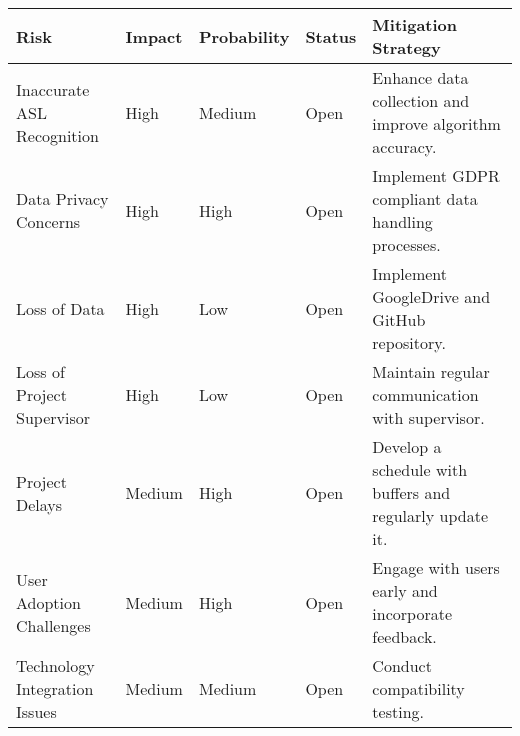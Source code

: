 \begin{longtable}{|>{\raggedright\arraybackslash}p{3cm}|>{\raggedright\arraybackslash}p{3cm}|>{\raggedright\arraybackslash}p{2cm}|>{\raggedright\arraybackslash}p{2cm}|>{\raggedright\arraybackslash}p{3cm}|}
    \hline
    \textbf{Risk} & \textbf{Impact} & \textbf{Probability} & \textbf{Status} & \textbf{Mitigation Strategy} \\
    \hline
    \endhead
    Inaccurate ASL Recognition & High & Medium & Open & Enhance data collection and improve algorithm accuracy. \\
    \hline
    Data Privacy Concerns & High & High & Open & Implement GDPR compliant data handling processes. \\
    \hline
    Loss of Data & High & Low & Open & Implement GoogleDrive and GitHub repository. \\
    \hline
    Loss of Project Supervisor & High & Low & Open & Maintain regular communication with supervisor. \\
    \hline
    Project Delays & Medium & High & Open & Develop a schedule with buffers and regularly update it. \\
    \hline
    User Adoption Challenges & Medium & High & Open & Engage with users early and incorporate feedback. \\
    \hline
    Technology Integration Issues & Medium & Medium & Open & Conduct compatibility testing. \\
    \hline
\end{longtable}